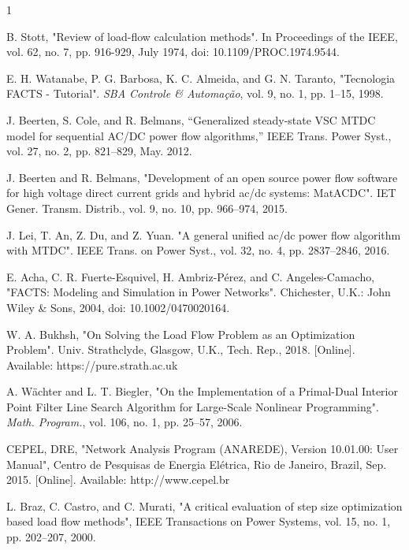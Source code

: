 \documentclass[letterpaper,journal]{IEEEtran}
\begin{document}
\begingroup
{}
\begin{thebibliography}{1}
	


	B. Stott, "Review of load-flow calculation methods". In Proceedings of the IEEE, vol. 62, no. 7, pp. 916-929, July 1974, doi: 10.1109/PROC.1974.9544.

	E. H. Watanabe, P. G. Barbosa, K. C. Almeida, and G. N. Taranto, "Tecnologia FACTS - Tutorial". \textit{SBA Controle \& Automação}, vol. 9, no. 1, pp. 1--15, 1998.

	J. Beerten, S. Cole, and R. Belmans, “Generalized steady-state VSC MTDC model for sequential AC/DC power flow algorithms,” IEEE Trans. Power Syst., vol. 27, no. 2, pp. 821–829, May.
	2012.

	J. Beerten and R. Belmans, "Development of an open source power flow software for high voltage direct current grids and hybrid ac/dc systems: MatACDC". IET Gener. Transm. Distrib., vol. 9, no. 10, pp. 966–974, 2015.

	J. Lei, T. An, Z. Du, and Z. Yuan. "A general unified ac/dc power flow algorithm with MTDC". IEEE Trans. on Power Syst., vol. 32, no. 4, pp. 2837–2846, 2016.

	E. Acha, C. R. Fuerte-Esquivel, H. Ambriz-P\'erez, and C. Angeles-Camacho, "FACTS: Modeling and Simulation in Power Networks". Chichester, U.K.: John Wiley \& Sons, 2004, doi: 10.1002/0470020164.

	W. A. Bukhsh, "On Solving the Load Flow Problem as an Optimization Problem". Univ. Strathclyde, Glasgow, U.K., Tech. Rep., 2018. [Online]. Available: https://pure.strath.ac.uk

	A. Wächter and L. T. Biegler, "On the Implementation of a Primal-Dual Interior Point Filter Line Search Algorithm for Large-Scale Nonlinear Programming". \textit{Math. Program.}, vol. 106, no. 1, pp. 25--57, 2006.

	CEPEL, DRE, "Network Analysis Program (ANAREDE), Version 10.01.00: User Manual", Centro de Pesquisas de Energia El\'etrica, Rio de Janeiro, Brazil, Sep. 2015. [Online]. Available: http://www.cepel.br

	L. Braz, C. Castro, and C. Murati, "A critical evaluation of step size optimization based load flow methods", IEEE Transactions on Power Systems, vol. 15, no. 1, pp. 202–207, 2000.


\end{thebibliography}
\end{document}
